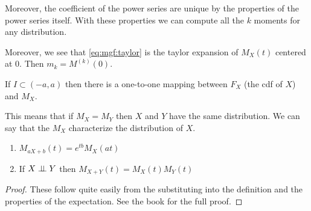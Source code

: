 \documentclass[14pt]{extarticle}
\begin{document}
Moreover, the coefficient of the power series are unique by the properties of the power series itself.
With these properties we can compute all the $k$ moments for any distribution.

Moreover, we see that \autoref{eq:mgf:taylor} is the taylor expansion of $M_X(t)$ centered at $0$. Then $m_k = M^{(k)}(0)$.

\begin{proposition}
    If $I \subset (-a, a)$ then there is a one-to-one mapping between $F_X$ (the cdf of $X$) and $M_X$.

    This means that if $M_X = M_Y$ then $X$ and $Y$ have the same distribution.
    We can say that the $M_X$ characterize the distribution of $X$.
\end{proposition}

\begin{proposition}
    \skiplineafterproof
    \begin{enumerate}
        \item $M_{aX + b}(t) = e^{tb} M_X (at)$
        \item If $X \perp \!\!\! \perp Y$ then $M_{X+Y}(t) = M_X(t) M_Y(t)$
    \end{enumerate}
\end{proposition}
\begin{proof}
    These follow quite easily from the substituting into the definition and the properties of the expectation.
    See the book for the full proof.
\end{proof}
\end{document}
